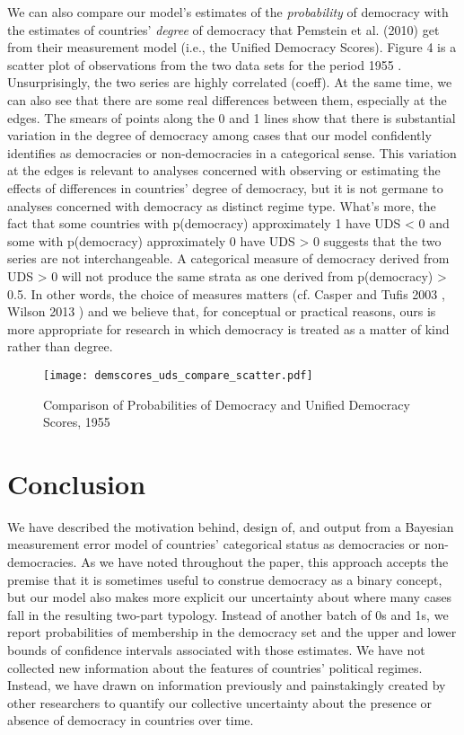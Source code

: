 \documentclass[letterpaper]{article}
\begin{document}
We can also compare our model's estimates of the \textit{probability} of democracy with the estimates of countries' \textit{degree} of democracy that Pemstein et al. (2010) \cite{uds} get from their measurement model (i.e., the Unified Democracy Scores). Figure 4 is a scatter plot of observations from the two data sets for the period 1955 . Unsurprisingly, the two series are highly correlated (coeff). At the same time, we can also see that there are some real differences between them, especially at the edges. The smears of points along the 0 and 1 lines show that there is substantial variation in the degree of democracy among cases that our model confidently identifies as democracies or non-democracies in a categorical sense. This variation at the edges is relevant to analyses concerned with observing or estimating the effects of differences in countries' degree of democracy, but it is not germane to analyses concerned with democracy as distinct regime type. What's more, the fact that some countries with p(democracy) approximately 1 have UDS < 0 and some with p(democracy) approximately 0 have UDS > 0 suggests that the two series are not interchangeable. A categorical measure of democracy derived from UDS > 0 will not produce the same strata as one derived from p(democracy) > 0.5. In other words, the choice of measures matters (cf. Casper and Tufis 2003 \cite{casper}, Wilson 2013 \cite{wilson}) and we believe that, for conceptual or practical reasons, ours is more appropriate for research in which democracy is treated as a matter of kind rather than degree.

\begin{figure}
    \centering
    \texttt{[image: demscores\_uds\_compare\_scatter.pdf]}
    \caption{Comparison of Probabilities of Democracy and Unified Democracy Scores, 1955}
    \label{fig:uds_compare}
\end{figure}

\section{Conclusion}

We have described the motivation behind, design of, and output from a Bayesian measurement error model of countries' categorical status as democracies or non-democracies. As we have noted throughout the paper, this approach accepts the premise that it is sometimes useful to construe democracy as a binary concept, but our model also makes more explicit our uncertainty about where many cases fall in the resulting two-part typology. Instead of another batch of 0s and 1s, we report probabilities of membership in the democracy set and the upper and lower bounds of confidence intervals associated with those estimates. We have not collected new information about the features of countries’ political regimes. Instead, we have drawn on information previously and painstakingly created by other researchers to  quantify our collective uncertainty about the presence or absence of democracy in countries over time.
\end{document}
